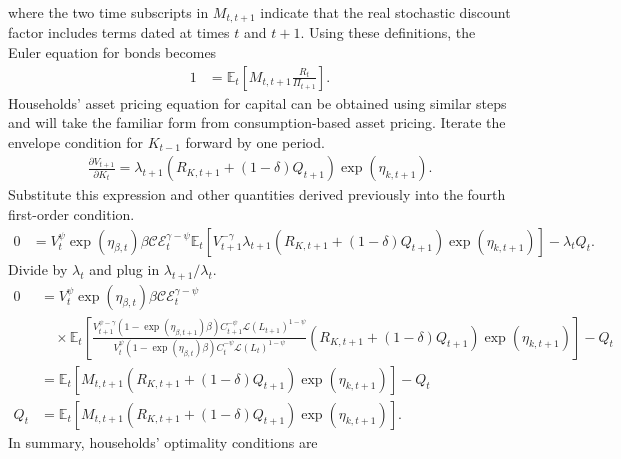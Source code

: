 \documentclass[12 pt, oneside]{article}
\theoremstyle{definition}
\theoremstyle{definition}
\theoremstyle{definition}
\newcommand{\E}{\mathbb{E}}
\newcommand{\calC}{\mathcal{C}}
\newcommand{\calE}{\mathcal{E}}
\newcommand{\calL}{\mathcal{L}}
\begin{document}
where the two time subscripts in $M_{t, t + 1}$ indicate that the real stochastic discount factor includes terms dated at times $t$ and $t + 1$.
Using these definitions, the Euler equation for bonds becomes
\begin{align}
  1 & = \E_t\left[M_{t, t + 1}\frac{R_t}{\Pi_{t + 1}}\right].
\end{align}
Households' asset pricing equation for capital can be obtained using similar steps and will take the familiar form from consumption-based asset pricing. Iterate the envelope condition for $K_{t - 1}$ forward by one period.
\begin{align*}
  \frac{\partial V_{t + 1}}{\partial K_t} = \lambda_{t + 1}(R_{K, t + 1} + (1 - \delta) Q_{t + 1})\exp(\eta_{k, t + 1}).
\end{align*}
Substitute this expression and other quantities derived previously into the fourth first-order condition.
\begin{align*}
  0 & = V_t^{\psi}\exp(\eta_{\beta, t})\beta \calC\calE_t^{\gamma - \psi}\E_t\left[V_{t + 1}^{-\gamma}\lambda_{t + 1}(R_{K, t + 1} + (1 - \delta) Q_{t + 1})\exp(\eta_{k, t + 1})\right] - \lambda_tQ_t.
\end{align*}
Divide by $\lambda_t$ and plug in $\lambda_{t + 1} / \lambda_t$.
\begin{align*}
  0 & = V_t^{\psi}\exp(\eta_{\beta, t})\beta \calC\calE_t^{\gamma - \psi}\\
    &\quad\times\E_t\left[\frac{V_{t + 1}^{\psi - \gamma} (1 - \exp(\eta_{\beta, t + 1})\beta)C_{t + 1}^{-\psi}\calL(L_{t + 1})^{1 - \psi}}{V_t^{\psi}(1 - \exp(\eta_{\beta, t})\beta)C_t^{-\psi} \calL(L_t)^{1 - \psi}}(R_{K, t + 1} + (1 - \delta) Q_{t + 1})\exp(\eta_{k, t + 1})\right] - Q_t\\
    & = \E_t\left[M_{t, t + 1}(R_{K, t + 1} + (1 - \delta)Q_{t + 1})\exp(\eta_{k, t + 1})\right] - Q_t\\
  Q_t & = \E_t\left[M_{t, t + 1}(R_{K, t + 1} + (1 - \delta)Q_{t + 1})\exp(\eta_{k, t + 1})\right].
\end{align*}
In summary, households' optimality conditions are
\end{document}
